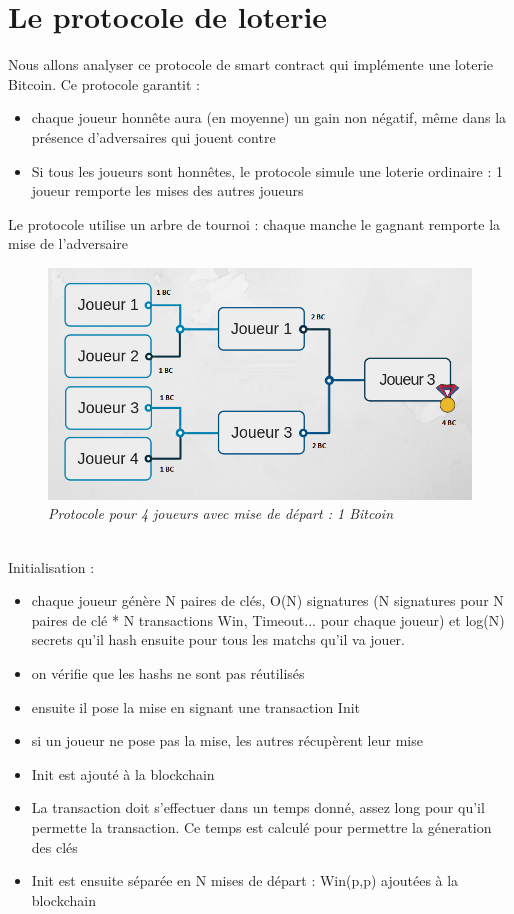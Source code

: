 \documentclass[conference]{IEEEtran}
\begin{document}
\section{Le protocole de loterie}
Nous allons analyser ce protocole de smart contract qui implémente une loterie Bitcoin\cite{955}. 
Ce protocole garantit :
\begin{itemize}
\item chaque joueur honnête aura (en moyenne) un gain non négatif, même dans la
présence d'adversaires qui jouent contre 
\item Si tous les joueurs sont honnêtes, le protocole simule une loterie ordinaire : 1 joueur remporte les mises des autres joueurs 
\end{itemize}
Le protocole utilise un arbre de tournoi : chaque manche le gagnant remporte la mise de l'adversaire \\
\begin{figure}[!h]
    \centering
    \includegraphics[scale=0.35]{arbre-tournoi.png}
    \caption{\textit{Protocole pour 4 joueurs avec mise de départ : 1 Bitcoin}}
    \label{fig:my_label}
\end{figure}
\vspace{0.3cm}\\
Initialisation : \\
\begin{itemize}
\item chaque joueur génère N paires de clés, O(N) signatures (N signatures pour N paires de clé * N transactions Win, Timeout... pour chaque joueur) et log(N) secrets qu'il hash ensuite pour tous les matchs qu'il va jouer.
\item on vérifie que les hashs ne sont pas réutilisés
\item ensuite il pose la mise en signant une transaction Init
\item si un joueur ne pose pas la mise, les autres récupèrent leur mise
\item Init est ajouté à la blockchain
\item La transaction doit s'effectuer dans un temps donné, assez long pour qu'il permette la transaction. Ce temps est calculé pour permettre la géneration des clés 
\item Init est ensuite séparée en N mises de départ : Win(p,p) ajoutées à la blockchain \\
\end{itemize}
\end{document}
